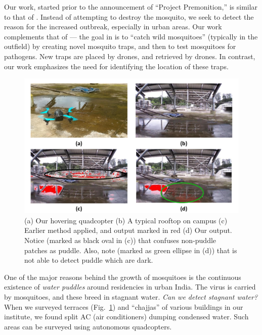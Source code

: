 \documentclass[11pt]{article}
\begin{document}
Our work, started prior to the announcement of ``Project
Premonition,'' is similar to that of \cite{Microsoft15}.  Instead of
attempting to destroy the mosquito, we seek to detect the reason for
the increased outbreak, especially in urban areas.  Our work complements that
of \cite{Microsoft15} --- the goal in \cite{Microsoft15} is to ``catch wild
mosquitoes'' (typically in the outfield) by creating novel mosquito traps, and
then to test mosquitoes for pathogens. New traps are placed by drones, and
retrieved by drones. In contrast, our work emphasizes the need for
identifying the location of these traps.  

\begin{figure}[h!]
\centering
\includegraphics[width=\linewidth]{stagnantWater/figures/teaser.pdf}
\caption{(a) Our hovering quadcopter (b) A typical
  rooftop on campus (c) Earlier method \cite{rankin2004daytime} applied, and
  output marked in red (d) Our output. Notice (marked as black oval in
  (c)) that \cite{rankin2004daytime} confuses non-puddle patches as puddle.
  Also, note (marked as green ellipse in (d)) that \cite{rankin2004daytime} is
  not able to detect puddle which are dark.}
\label{teaser} 
\end{figure}

One of the major reasons behind the growth of mosquitoes is the
continuous existence of \emph{water puddles} around residencies in
urban India.  The virus is carried by mosquitoes, and these breed in
stagnant water. \emph{Can we detect stagnant water?}  When we surveyed
terraces (Fig.~\ref{teaser}) and ``chajjas'' of various buildings in
our institute, we found split AC (air conditioners) dumping condensed
water. Such areas can be surveyed using autonomous quadcopters.
\end{document}
